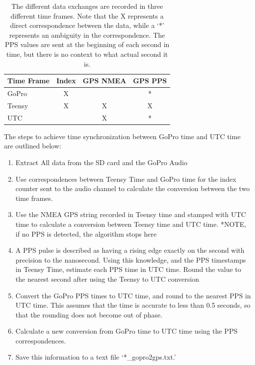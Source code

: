 		\begin{table}[htbp]
			\centering
			\caption{The different data exchanges are recorded in three different time frames.  Note that the X represents a direct correspondence between the data, while a `*' represents an ambiguity in the correspondence. The PPS values are sent at the beginning of each second in time, but there is no context to what actual second it is.}
			\begin{tabular}{| l | c | c | c |}
				\hline
				Time Frame & Index & GPS NMEA & GPS PPS \\
				\hline
				GoPro & X     &       & * \\ 			\hline
				Teensy & X     & X     & X \\ 			\hline 
				UTC   &       & X     & * \\
				\hline
			\end{tabular}%
			\label{tab:timeframes}%
		\end{table}%
		
		The steps to achieve time synchronization between GoPro time and UTC time are outlined below:
		\begin{enumerate}
		\item Extract All data from the SD card and the GoPro Audio
		\item Use correspondences between Teensy Time and GoPro time for the index counter sent to the audio channel to calculate the conversion between the two time frames.
		\item Use the NMEA GPS string recorded in Teensy time and stamped with UTC time to calculate a conversion between Teensy time and UTC time.  *NOTE, if no PPS is detected, the algorithm stops here
		\item A PPS pulse is described as having a rising edge exactly on the second with precision to the nanosecond.  Using this knowledge, and the PPS timestamps in Teensy Time, estimate each PPS time in UTC time.  Round the value to the nearest second after using the Teensy to UTC conversion
		\item Convert the GoPro PPS times to UTC time, and round to the nearest PPS in UTC time.  This assumes that the time is accurate to less than 0.5 seconds, so that the rounding does not become out of phase.
		\item Calculate a new conversion from GoPro time to UTC time using the PPS correspondences.
		\item Save this information to a text file `*\_gopro2gps.txt.'
		\end{enumerate}
	
